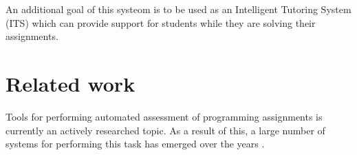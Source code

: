 An additional goal of this systeom is to be used as an Intelligent
Tutoring System (ITS)\cite{Freedman:2000:LIT:350752.350756} which can
provide support for students while they are solving their assignments.



\section{Related work}
Tools for performing automated assessment of programming assignments
is currently an actively researched topic. As a result of this, a
large number of systems for performing this task has emerged over the
years \cite{Ihantola:2010:RRS:1930464.1930480}.




